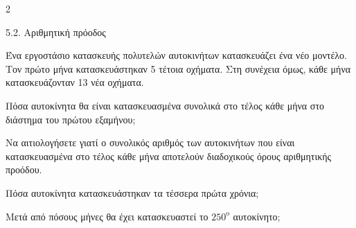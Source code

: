 \begin{ylh}{2}
    \item 5.2. Αριθμητική πρόοδος
\end{ylh}
Ένα εργοστάσιο κατασκευής πολυτελών αυτοκινήτων κατασκευάζει ένα νέο μοντέλο. Τον πρώτο μήνα κατασκευάστηκαν 5 τέτοια οχήματα. Στη συνέχεια όμως, κάθε μήνα κατασκευάζονταν 13 νέα οχήματα. 
\begin{alist}
\item Πόσα αυτοκίνητα θα είναι κατασκευασμένα συνολικά στο τέλος κάθε μήνα στο διάστημα του πρώτου εξαμήνου;
\item Να αιτιολογήσετε γιατί ο συνολικός αριθμός των αυτοκινήτων που είναι κατασκευασμένα στο τέλος κάθε μήνα αποτελούν διαδοχικούς όρους αριθμητικής προόδου.
\item Πόσα αυτοκίνητα κατασκευάστηκαν τα τέσσερα πρώτα χρόνια;
\item Μετά από πόσους μήνες θα έχει κατασκευαστεί το $250^{\text{ο}}$ αυτοκίνητο;
\end{alist}

